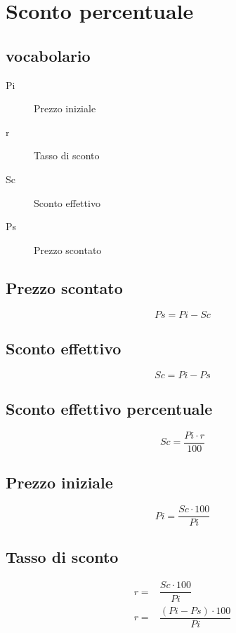 \chapter{Sconto percentuale}
\section{vocabolario}
\begin{description}
	\item[Pi] Prezzo iniziale
	\item[r] Tasso di sconto
	\item[Sc] Sconto effettivo
	\item[Ps] Prezzo scontato
\end{description}\section{Prezzo scontato}
\begin{equation}
Ps=Pi-Sc
\end{equation}
\section{Sconto effettivo}
\begin{equation}
Sc=Pi-Ps
\end{equation}

\section{Sconto effettivo percentuale}
\begin{equation}
Sc=\dfrac{Pi\cdot r}{100}
\end{equation}
\section{Prezzo iniziale}
\begin{equation}
Pi=\dfrac{Sc\cdot 100}{Pi}
\end{equation}

\section{Tasso di sconto}
\begin{align}
r=&\dfrac{Sc\cdot 100}{Pi}\\
r=&\dfrac{(Pi-Ps)\cdot 100}{Pi}
\end{align}
